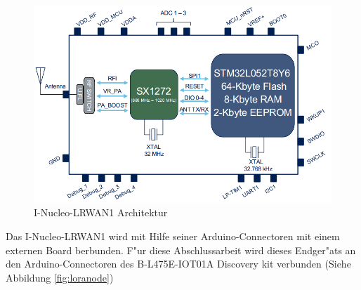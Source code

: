 \begin{figure}[h]
	\centering
	\includegraphics[width=14cm]{source/images/LoRa_Intern}
	\caption{I-Nucleo-LRWAN1 Architektur \cite{LoRaMod}\label{fig:loraMod_intern}}
\end{figure}

Das I-Nucleo-LRWAN1 wird mit Hilfe seiner Arduino-Connectoren mit einem externen Board berbunden. F"ur diese Abschlussarbeit wird dieses Endger"ats an den Arduino-Connectoren des B-L475E-IOT01A Discovery kit verbunden (Siehe Abbildung \ref{fig:loranode})

